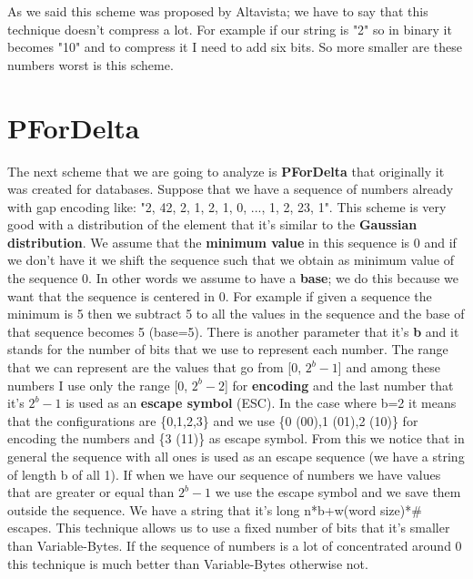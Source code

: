 As we said this scheme was proposed by Altavista; we have to say that this technique doesn't compress a lot. For example if our string is "2" so in binary it becomes "10" and to compress it I need to add six bits. So more smaller are these numbers worst is this scheme.\newline
\section{PForDelta}
The next scheme that we are going to analyze is \textbf{PForDelta} that originally it was created for databases.\newline
Suppose that we have a sequence of numbers already with gap encoding like: "2, 42, 2, 1, 2, 1, 0, ..., 1, 2, 23, 1". This scheme is very good with a distribution of the element that it's similar to the \textbf{Gaussian distribution}.\newline
We assume that the \textbf{minimum value} in this sequence is 0 and if we don't have it we shift the sequence such that we obtain as minimum value of the sequence 0. In other words we assume to have a \textbf{base}; we do this because we want that the sequence is centered in 0.\newline
For example if given a sequence the minimum is 5 then we subtract 5 to all the values in the sequence and the base of that sequence becomes 5 (base=5).\newline
There is another parameter that it's \textbf{b} and it stands for the number of bits that we use to represent each number. The range that we can represent are the values that go from [0, $2^b-1$] and among these numbers I use only the range [0, $2^b-2$] for \textbf{encoding} and the last number that it's $2^b-1$ is used as an \textbf{escape symbol} (ESC).\newline
In the case where b=2 it means that the configurations are \{0,1,2,3\} and we use \{0 (00),1 (01),2 (10)\} for encoding the numbers and \{3 (11)\} as escape symbol. From this we notice that in general the sequence with all ones is used as an escape sequence (we have a string of length b of all 1).\newline
If when we have our sequence of numbers we have values that are greater or equal than $2^b-1$ we use the escape symbol and we save them outside the sequence. We have a string that it's long n*b+w(word size)*\# escapes. This technique allows us to use a fixed number of bits that it's smaller than Variable-Bytes. If the sequence of numbers is a lot of concentrated around 0 this technique is much better than Variable-Bytes otherwise not.\newline

